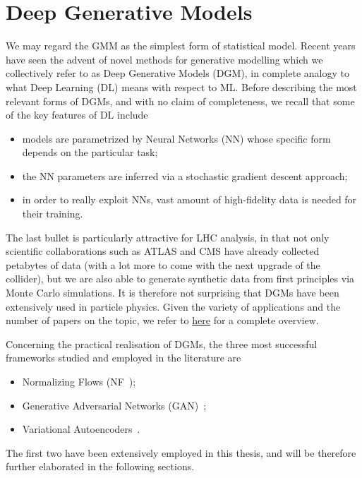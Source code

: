 \section{Deep Generative Models}\label{sec:DGM}
We may regard the GMM as the simplest form of statistical model. Recent years have seen the advent of novel methods for generative modelling which we collectively refer to as Deep Generative Models (DGM), in complete analogy to what Deep Learning (DL) means with respect to ML. 
Before describing the most relevant forms of DGMs, and with no claim of completeness, we recall that some of the key features of DL include
\begin{itemize}
\item
models are parametrized by Neural Networks (NN) whose specific form depends on the particular task;
\item
the NN parameters are inferred via a stochastic gradient descent approach;
\item
in order to really exploit NNs, vast amount of high-fidelity data is needed for their training.
\end{itemize}
The last bullet is particularly attractive for LHC analysis, in that not only scientific collaborations such as ATLAS and CMS have already collected petabytes of data (with a lot more to come with the next upgrade of the collider), but we are also able to generate synthetic data from first principles via Monte Carlo simulations. It is therefore not surprising that DGMs have been extensively used in particle physics. Given the variety of applications and the number of papers on the topic, we refer to \href{https://github.com/iml-wg/HEPML-LivingReview}{here} for a complete overview.

Concerning the practical realisation of DGMs, the three most successful frameworks studied and employed in the literature are
\begin{itemize}
\item
Normalizing Flows (NF~\cite{inn,coupling2,glow, nflow1,papamakarios2019normalizing,nflow_review,mller2018neural, grathwohl2018ffjord,chen2019neural});
\item
Generative Adversarial Networks (GAN)~\cite{goodfellow,Creswell2018};
\item
Variational Autoencoders~\cite{kingma2014autoencoding,Kingma2019}.
\end{itemize}
The first two have been extensively employed in this thesis, and will be therefore further elaborated in the following sections.

